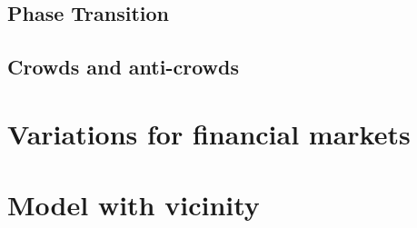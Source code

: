 \subsection{Phase Transition}
\label{subsec:phasetransition}

\subsection{Crowds and anti-crowds}
\label{subsec:crowds}






\section{Variations for financial markets}
\label{minority:variations}

\section{Model with vicinity}
\label{minority:vicinity}
